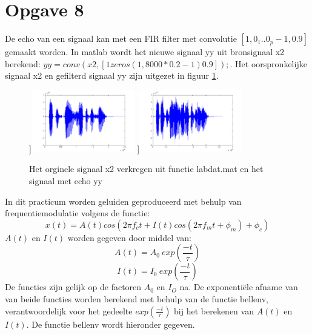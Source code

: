 \documentclass{article}
\begin{document}
\section{Opgave 8}
De echo van een signaal kan met een FIR filter met convolutie $[1, 0_1 .. 0_p-1, 0.9]$ gemaakt worden. In matlab wordt het nieuwe signaal yy uit bronsignaal x2 berekend: $yy = conv(x2, [1 zeros(1,8000*0.2 - 1) 0.9]);$. Het oorspronkelijke signaal x2 en gefilterd signaal yy zijn uitgezet in figuur \ref{fig:opgave8}.
\begin{figure}[h]
  \centering
 	\subfloat[][x2[n]]{\includegraphics[width=0.4\textwidth]{content/8x2.png}}
	\subfloat[][yy[n]]{\includegraphics[width=0.4\textwidth]{content/8yy.png}}
  \caption{Het orginele signaal x2 verkregen uit functie labdat.mat en het signaal met echo yy}
  \label{fig:opgave8}
\end{figure}




In dit practicum worden geluiden geproduceerd met behulp van frequentiemodulatie volgens de functie:
$$x(t) = A(t)cos(2 \pi f_c t + I(t)cos(2 \pi f_m t + \phi_m) + \phi_c)$$
$A(t)$ en $I(t)$ worden gegeven door middel van:
$$A(t) = A_0~exp(\frac{-t}{\tau})$$
$$I(t) = I_0~exp(\frac{-t}{\tau})$$
De functies zijn gelijk op de factoren $A_0$ en $I_O$ na. De  exponenti\"ele afname van van beide functies worden berekend met behulp van de functie bellenv, verantwoordelijk voor het gedeelte $exp(\frac{-t}{\tau})$ bij het berekenen van $A(t)$ en $I(t)$. De functie bellenv wordt hieronder gegeven.
\end{document}
